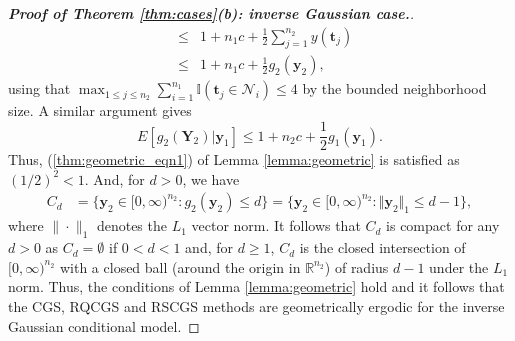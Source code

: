 \documentclass[12pt]{article}
\theoremstyle{definition}
\begin{document}
\begin{proof}[\bf Proof of Theorem \ref{thm:cases}(b): inverse Gaussian case.]
\begin{eqnarray*}
  &\leq&  1 + n_1 c  +  \frac{1}{2}\sum_{j=1}^{n_2}   y(\boldsymbol t_j) \\
  &\leq& 1 + n_1 c  +  \frac{1}{2} g_2(\boldsymbol y_2 ),
  \end{eqnarray*}
  using that $ \max_{1 \leq j \leq n_2} \sum_{i=1}^{n_1} \mathbb{I}( \boldsymbol t_j \in \mathcal{N}_i) \leq 4$ by the bounded  neighborhood size.
 A similar argument gives
 \[
 E  [g_2(\boldsymbol Y_2) \big| \boldsymbol y_1 ]  \leq  1 + n_2 c  +  \frac{1}{2} g_1(\boldsymbol y_1 ).
 \]
   Thus, (\ref{thm:geometric_eqn1}) of Lemma \ref{lemma:geometric} is satisfied as $ (1/2)^2 < 1$.
And, for $d > 0$, we have
\begin{align*}
C_d &= \{\boldsymbol y_2 \in [0,\infty)^{n_2} : g_{2}(\boldsymbol y_2) \le d\} =   \{ \boldsymbol y_2 \in [0,\infty)^{n_2} :   \Vert\boldsymbol y_2 \Vert_1  \le d - 1\},
\end{align*}
where $\|\cdot\|_1$ denotes  the $L_1$ vector norm.  It follows that $ C_d$ is compact for any $d>0$ as 
 $C_d = \emptyset$ if $0 < d < 1$ and, for $d \geq 1  $, $C_d$ is the closed intersection of $[0,\infty)^{n_2}$ with a closed ball (around the origin in  $\mathbb{R}^{n_2}$) of radius $d - 1$ under the $L_1$ norm. Thus, the conditions of Lemma \ref{lemma:geometric} hold and it follows that the CGS, RQCGS  and RSCGS methods are geometrically ergodic for the inverse Gaussian conditional model.  
\end{proof}
 
\end{document}
